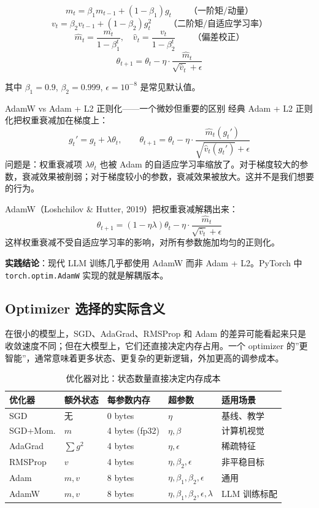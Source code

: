 \documentclass[a4paper]{article}
\begin{document}
$$
m_t = \beta_1 m_{t-1} + (1 - \beta_1) g_t \qquad \text{（一阶矩/动量）}
$$
$$
v_t = \beta_2 v_{t-1} + (1 - \beta_2) g_t^2 \qquad \text{（二阶矩/自适应学习率）}
$$
$$
\hat{m}_t = \frac{m_t}{1 - \beta_1^t}, \quad \hat{v}_t = \frac{v_t}{1 - \beta_2^t} \qquad \text{（偏差校正）}
$$
$$
\theta_{t+1} = \theta_t - \eta \cdot \frac{\hat{m}_t}{\sqrt{\hat{v}_t} + \epsilon}
$$

其中 $\beta_1 = 0.9$, $\beta_2 = 0.999$, $\epsilon = 10^{-8}$ 是常见默认值。

\begin{knowledgebox}{AdamW vs Adam + L2 正则化——一个微妙但重要的区别}
经典 Adam + L2 正则化把权重衰减加在梯度上：
$$
g_t' = g_t + \lambda \theta_t, \qquad \theta_{t+1} = \theta_t - \eta \cdot \frac{\hat{m}_t(g_t')}{\sqrt{\hat{v}_t(g_t')} + \epsilon}
$$
问题是：权重衰减项 $\lambda \theta_t$ 也被 Adam 的自适应学习率缩放了。对于梯度较大的参数，衰减效果被削弱；对于梯度较小的参数，衰减效果被放大。这并不是我们想要的行为。

AdamW（Loshchilov \& Hutter, 2019）把权重衰减解耦出来：
$$
\theta_{t+1} = (1 - \eta \lambda) \theta_t - \eta \cdot \frac{\hat{m}_t}{\sqrt{\hat{v}_t} + \epsilon}
$$
这样权重衰减不受自适应学习率的影响，对所有参数施加均匀的正则化。

\textbf{实践结论}：现代 LLM 训练几乎都使用 AdamW 而非 Adam + L2。PyTorch 中 \texttt{torch.optim.AdamW} 实现的就是解耦版本。
\end{knowledgebox}

\subsection{Optimizer 选择的实际含义}

在很小的模型上，SGD、AdaGrad、RMSProp 和 Adam 的差异可能看起来只是收敛速度不同；但在大模型上，它们还直接决定内存占用。一个 optimizer 的”更智能”，通常意味着更多状态、更复杂的更新逻辑，外加更高的调参成本。

\begin{table}[H]
\centering
\begin{tabular}{p{}p{}p{}p{}p{}}
\toprule
\textbf{优化器} & \textbf{额外状态} & \textbf{每参数内存} & \textbf{超参数} & \textbf{适用场景} \\
\midrule
SGD & 无 & 0 bytes & $\eta$ & 基线、教学 \\
SGD+Mom. & $m$ & 4 bytes (fp32) & $\eta, \beta$ & 计算机视觉 \\
AdaGrad & $\sum g^2$ & 4 bytes & $\eta, \epsilon$ & 稀疏特征 \\
RMSProp & $v$ & 4 bytes & $\eta, \beta_2, \epsilon$ & 非平稳目标 \\
Adam & $m, v$ & 8 bytes & $\eta, \beta_1, \beta_2, \epsilon$ & 通用 \\
AdamW & $m, v$ & 8 bytes & $\eta, \beta_1, \beta_2, \epsilon, \lambda$ & LLM 训练标配 \\
\bottomrule
\end{tabular}
\caption{优化器对比：状态数量直接决定内存成本}
\end{table}
\end{document}
